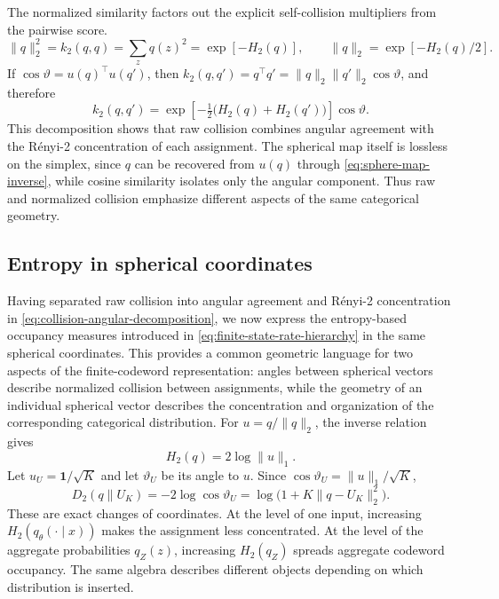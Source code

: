 The normalized similarity factors out the explicit self-collision multipliers from the pairwise score.
\begin{equation}
\|q\|_2^2
=k_2(q,q)
=\sum_z q(z)^2
=\exp[-H_2(q)],
\qquad
\|q\|_2
=\exp[-H_2(q)/2].
\label{eq:collision-norm-entropy}
\end{equation}
If $\cos\vartheta=u(q)^\top u(q')$, then
$k_2(q,q')=q^\top q'=\|q\|_2\|q'\|_2\cos\vartheta$, and therefore
\begin{equation}
k_2(q,q')
=\exp\!\left[-\tfrac12\bigl(H_2(q)+H_2(q')\bigr)\right]\cos\vartheta.
\label{eq:collision-angular-decomposition}
\end{equation}
This decomposition shows that raw collision combines angular agreement with the R\'enyi-2 concentration of each assignment.
The spherical map itself is lossless on the simplex, since $q$ can be recovered from $u(q)$ through \cref{eq:sphere-map-inverse}, while cosine similarity isolates only the angular component.
Thus raw and normalized collision emphasize different aspects of the same categorical geometry.

\subsection{Entropy in spherical coordinates}

Having separated raw collision into angular agreement and R\'enyi-2 concentration in \cref{eq:collision-angular-decomposition}, we now express the entropy-based occupancy measures introduced in \cref{eq:finite-state-rate-hierarchy} in the same spherical coordinates.
This provides a common geometric language for two aspects of the finite-codeword representation: angles between spherical vectors describe normalized collision between assignments, while the geometry of an individual spherical vector describes the concentration and organization of the corresponding categorical distribution.
For $u=q/\|q\|_2$, the inverse relation gives
\begin{equation}
H_2(q)=2\log\|u\|_1.
\label{eq:h2-spherical}
\end{equation}
Let $u_U=\mathbf1/\sqrt K$ and let $\vartheta_U$ be its angle to $u$.
Since $\cos\vartheta_U=\|u\|_1/\sqrt K$,
\begin{equation}
D_2(q\|U_K)=-2\log\cos\vartheta_U
=\log\bigl(1+K\|q-U_K\|_2^2\bigr).
\label{eq:renyi-angular}
\end{equation}
These are exact changes of coordinates.
At the level of one input, increasing $H_2(q_\theta(\cdot\mid x))$ makes the assignment less concentrated.
At the level of the aggregate probabilities $q_Z(z)$, increasing $H_2(q_Z)$ spreads aggregate codeword occupancy.
The same algebra describes different objects depending on which distribution is inserted.

